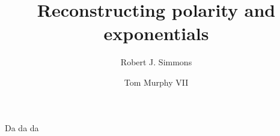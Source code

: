 \documentclass[acmtocl]%
{boviktrans}
\title{Reconstructing polarity and exponentials}
\author{Robert J. Simmons \and Tom Murphy VII}
\begin{document}
\maketitle

Da da da
\end{document}
